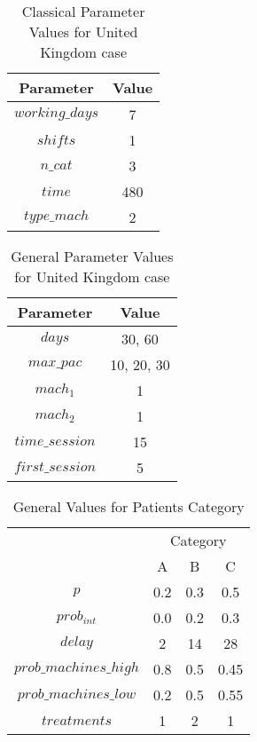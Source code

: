 \begin{table}[h!]
\centering
\begin{tabular}{|c|c|}
			\hline
			Parameter & Value\\
			\hline
			 $working\_days$	& 7\\
			 $shifts$		& 1\\
			 $n\_cat$		& 3\\
			 $time$			& 480\\
			 $type\_mach$		& 2\\
			 \hline
\end{tabular}
\caption{Classical Parameter Values for United Kingdom case}
\end{table}

\begin{table}[h!]
\centering
\begin{tabular}{|c|c|}
			\hline
			Parameter & Value\\
			\hline
			 $days$		 & 30, 60\\
			 $max\_pac$	 & 10, 20, 30\\
			 $mach_1$	 & 1\\
			 $mach_2$	 & 1\\
			 $time\_session$ & 15\\
			 $first\_session$& 5\\
			 \hline
\end{tabular}
\caption{General Parameter Values for United Kingdom case}
\end{table}

\begin{table}[h]
\begin{tabular}{c|c|c|c|}
\cline{2-4}
                                             & \multicolumn{3}{c|}{Category} \\ \cline{2-4} 
                                             & A        & B       & C        \\ \hline
\multicolumn{1}{|c|}{$p$}                    & 0.2      & 0.3     & 0.5      \\ \hline
\multicolumn{1}{|c|}{$prob_{int}$}           & 0.0      & 0.2     & 0.3      \\ \hline
\multicolumn{1}{|c|}{$delay$}                & 2        & 14      & 28       \\ \hline
\multicolumn{1}{|c|}{$prob\_machines\_high$} & 0.8      & 0.5     & 0.45     \\ \hline
\multicolumn{1}{|c|}{$prob\_machines\_low$}  & 0.2      & 0.5     & 0.55     \\ \hline
\multicolumn{1}{|c|}{$treatments$}           & 1        & 2       & 1         \\ \hline
\end{tabular}
\caption{General Values for Patients Category}
\end{table}


